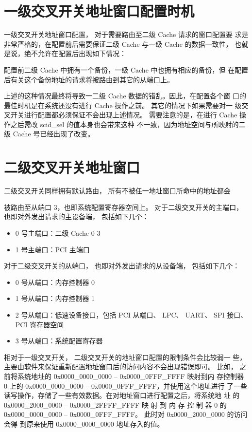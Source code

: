 \section{一级交叉开关地址窗口配置时机}

一级交叉开关地址窗口配置， 对于需要路由至二级 Cache 请求的窗口配置要
求是非常严格的，在配置前后需要保证二级 Cache 与一级 Cache 的数据一致性，
也就是说，绝不允许在配置后出现如下情况：
\begin{emph}
  配置前二级 Cache 中拥有一个备份，一级 Cache 中也拥有相应的备份，但
  在配置后有关这个备份地址的请求将被路由到其它的从端口上。
\end{emph}
上述的这种情况最终将导致一二级 Cache 数据的错乱。因此，在配置各个窗
口的最佳时机是在系统还没有进行 Cache 操作之前。 其它的情况下如果需要对一
级交叉开关进行配置都必须保证不会出现上述情况。 需要注意的是，在进行 Cache
操作之后需改 scid\_sel 的值本身也会带来这种 不一致，因为地址空间与所映射的二级
Cache 号已经出现了改变。

\section{二级交叉开关地址窗口}

二级交叉开关同样拥有默认路由， 所有不被任一地址窗口所命中的地址都会

被路由至从端口 3，也即系统配置寄存器空间上。 对于二级交叉开关的主端口，
也即对外发出请求的主设备端， 包括如下几个：
\begin{itemize}
  \item 0 号主端口：二级 Cache 0-3
  \item 1 号主端口：PCI 主端口
\end{itemize}
对于二级交叉开关的从端口， 也即对外发出请求的从设备端， 包括如下几个：
\begin{itemize}
  \item 0 号从端口：内存控制器 0
  \item 1 号从端口：内存控制器 1
  \item 2 号从端口：低速设备接口，包括 PCI 从端口、 LPC、 UART、 SPI 接口、PCI
    寄存器空间
  \item 3 号从端口：系统配置寄存器
\end{itemize}

相对于一级交叉开关， 二级交叉开关的地址窗口配置的限制条件会比较弱一
些，主要由软件来保证重新配置地址窗口后的访问内容不会出现错误即可。 比如，
之前将系统地址的 0x0000\_0000\_0000 – 0x0000\_0FFF\_FFFF 映射到内 存控制器 0
上的 0x0000\_0000\_0000 – 0x0000\_0FFF\_FFFF，并使用这个地址进行
了一些读写操作，存储了一些有效数据。在对地址窗口进行配置之后，将系统地 址 的
0x0000\_2000\_0000 – 0x0000\_2FFFF\_FFFF 映 射 到 内 存 控 制 器 0 的
0x0000\_0000\_0000 – 0x0000\_0FFF\_FFFF。 此时对 0x0000\_2000\_0000 的访问会得
到原来使用 0x0000\_0000\_0000 地址存入的值。

